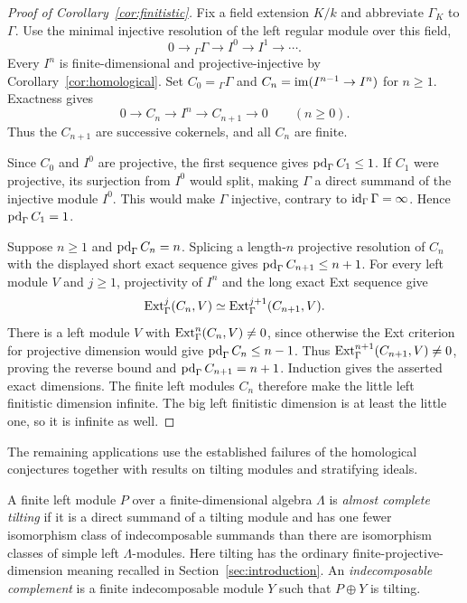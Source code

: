 \begin{proof}[Proof of Corollary~\ref{cor:finitistic}]
Fix a field extension $K/k$ and abbreviate $\Gamma_K$ to $\Gamma$.
Use the minimal injective resolution of the left regular module over
this field,
\[
 0\longrightarrow {}_\Gamma\Gamma\longrightarrow I^0
 \longrightarrow I^1\longrightarrow\cdots.
\]
Every $I^n$ is finite-dimensional and projective-injective by
Corollary~\ref{cor:homological}. Set $C_0={}_\Gamma\Gamma$ and
$C_n=\operatorname{im}(I^{n-1}\to I^n)$ for $n\geq1$. Exactness gives
\[
 0\longrightarrow C_n\longrightarrow I^n\longrightarrow C_{n+1}
 \longrightarrow0\qquad(n\geq0).
\]
Thus the $C_{n+1}$ are successive cokernels, and all $C_n$ are finite.

Since $C_0$ and $I^0$ are projective, the first sequence gives
$\operatorname{pd}_\Gamma C_1\leq1$. If $C_1$ were projective, its surjection from
$I^0$ would split, making $\Gamma$ a direct summand of the injective
module $I^0$. This would make $\Gamma$ injective, contrary to
$\operatorname{id}_\Gamma\Gamma=\infty$. Hence $\operatorname{pd}_\Gamma C_1=1$.

Suppose $n\geq1$ and $\operatorname{pd}_\Gamma C_n=n$. Splicing a length-$n$
projective resolution of $C_n$ with the displayed short exact sequence
gives $\operatorname{pd}_\Gamma C_{n+1}\leq n+1$. For every left module $V$ and
$j\geq1$, projectivity of $I^n$ and the long exact Ext sequence give
\[
 \operatorname{Ext}_\Gamma^j(C_n,V)\simeq\operatorname{Ext}_\Gamma^{j+1}(C_{n+1},V).
\]
There is a left module $V$ with $\operatorname{Ext}_\Gamma^n(C_n,V)\neq0$, since
otherwise the Ext criterion for projective dimension would give
$\operatorname{pd}_\Gamma C_n\leq n-1$. Thus
$\operatorname{Ext}_\Gamma^{n+1}(C_{n+1},V)\neq0$, proving the reverse bound and
$\operatorname{pd}_\Gamma C_{n+1}=n+1$. Induction gives the asserted exact dimensions.
The finite left modules $C_n$ therefore make the little left finitistic
dimension infinite. The big left finitistic dimension is at least the
little one, so it is infinite as well.
\end{proof}

The remaining applications use the established failures of the homological
conjectures together with results on tilting modules and stratifying ideals.

A finite left module $P$ over a finite-dimensional algebra $\Lambda$
is \emph{almost complete tilting} if it is a direct summand of a tilting
module and has one fewer isomorphism class of indecomposable summands
than there are isomorphism classes of simple left $\Lambda$-modules.
Here tilting has the ordinary finite-projective-dimension meaning
recalled in Section~\ref{sec:introduction}. An \emph{indecomposable
complement} is a finite indecomposable module $Y$ such that $P\oplus Y$
is tilting.


